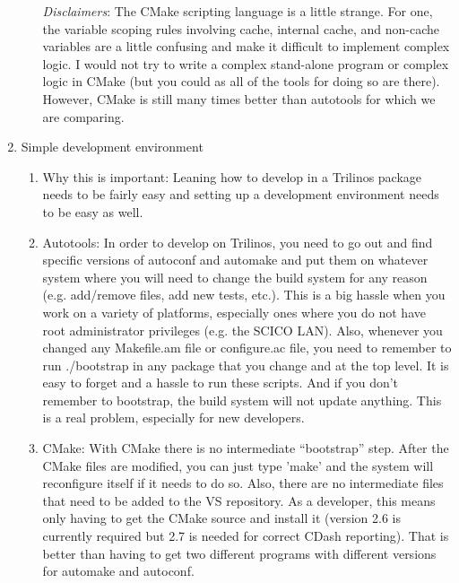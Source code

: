 \documentclass[pdf,ps2pdf,11pt]{SANDreport}
\begin{document}
\begin{enumerate}
\begin{enumerate}
  {}\textit{Disclaimers}: The CMake scripting language is a little
  strange.  For one, the variable scoping rules involving cache,
  internal cache, and non-cache variables are a little confusing and
  make it difficult to implement complex logic.  I would not try to
  write a complex stand-alone program or complex logic in CMake (but
  you could as all of the tools for doing so are there).  However,
  CMake is still many times better than autotools for which we are
  comparing.

  \end{enumerate}

{}\item Simple development environment

  \begin{enumerate}

  {}\item Why this is important: Leaning how to develop in a Trilinos
  package needs to be fairly easy and setting up a development
  environment needs to be easy as well.

  {}\item Autotools: In order to develop on Trilinos, you need to go
  out and find specific versions of autoconf and automake and put them
  on whatever system where you will need to change the build system
  for any reason (e.g. add/remove files, add new tests, etc.).  This
  is a big hassle when you work on a variety of platforms, especially
  ones where you do not have root administrator privileges (e.g. the
  SCICO LAN).  Also, whenever you changed any Makefile.am file or
  configure.ac file, you need to remember to run ./bootstrap in any
  package that you change and at the top level.  It is easy to forget
  and a hassle to run these scripts.  And if you don't remember to
  bootstrap, the build system will not update anything.  This is a
  real problem, especially for new developers.

  {}\item CMake: With CMake there is no intermediate ``bootstrap''
  step.  After the CMake files are modified, you can just type 'make'
  and the system will reconfigure itself if it needs to do so. Also, there
  are no intermediate files that need to be added to the VS
  repository.  As a developer, this means only having to get the CMake
  source and install it (version 2.6 is currently required but 2.7 is
  needed for correct CDash reporting).  That is better than having to
  get two different programs with different versions for automake and
  autoconf. 


\end{enumerate}
\end{enumerate}
\end{document}
